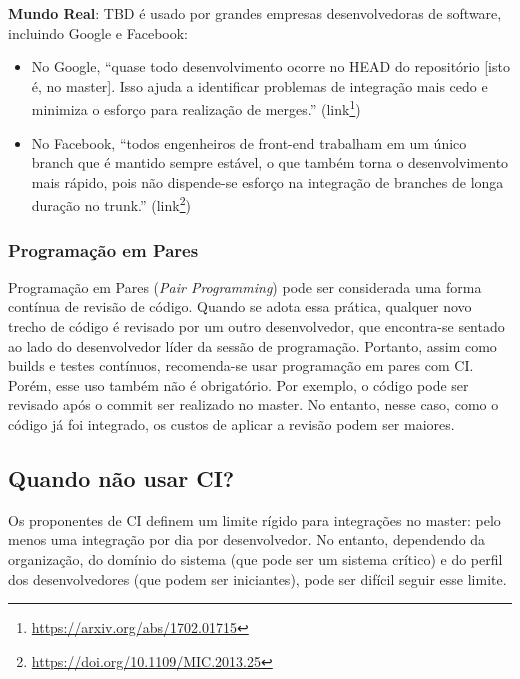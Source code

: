 \documentclass[
  11pt,
  twoside]{book}
\DeclareRobustCommand{\href}[2]{#2\footnote{\url{#1}}}
\newenvironment{esmbox}{\centering \vspace{1.5ex} \begin{tcolorbox}[breakable, colback=backcolor, width=4.9in]}{\end{tcolorbox} \vspace{1.5ex}}
\begin{document}
\begin{esmbox}

\textbf{Mundo Real}: TBD é usado por grandes empresas desenvolvedoras de
software, incluindo Google e Facebook:

\begin{itemize}
\item
  No Google,  ``quase todo desenvolvimento ocorre no HEAD
  do repositório {[}isto é, no master{]}. Isso ajuda a identificar
  problemas de integração mais cedo e minimiza o esforço para realização
  de merges.'' (\href{https://arxiv.org/abs/1702.01715}{link})
\item
  No Facebook,  ``todos engenheiros de front-end
  trabalham em um único branch que é mantido sempre estável, o que
  também torna o desenvolvimento mais rápido, pois não dispende-se
  esforço na integração de branches de longa duração no trunk.''
  (\href{https://doi.org/10.1109/MIC.2013.25}{link})
\end{itemize}

\end{esmbox}

\hypertarget{programauxe7uxe3o-em-pares}{%
\subsubsection*{Programação em Pares}\label{programauxe7uxe3o-em-pares}}

Programação em Pares (\emph{Pair Programming}) pode ser considerada uma
forma contínua de revisão de código. Quando se adota essa prática,
qualquer novo trecho de código é revisado por um outro desenvolvedor,
que encontra-se sentado ao lado do desenvolvedor líder da sessão de
programação. Portanto, assim como builds e testes contínuos,
recomenda-se usar programação em pares com CI. Porém, esse uso também
não é obrigatório. Por exemplo, o código pode ser revisado após o commit
ser realizado no master. No entanto, nesse caso, como o código já foi
integrado, os custos de aplicar a revisão podem ser maiores.

\hypertarget{quando-nuxe3o-usar-ci}{%
\subsection{Quando não usar CI?}\label{quando-nuxe3o-usar-ci}}


Os proponentes de CI definem um limite rígido para integrações no
master: pelo menos uma integração por dia por desenvolvedor. No entanto,
dependendo da organização, do domínio do sistema (que pode ser um
sistema crítico) e do perfil dos desenvolvedores (que podem ser
iniciantes), pode ser difícil seguir esse limite.
\end{document}
